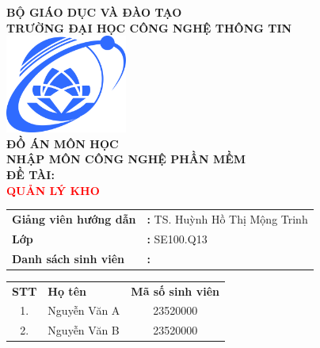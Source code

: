 \documentclass[../main.tex]{subfiles}
\begin{document}
\begin{titlepage}
    \centering
    
    \vspace*{1cm}
    {\large\textbf{BỘ GIÁO DỤC VÀ ĐÀO TẠO}}\\[0.3cm]
    {\large\textbf{TRƯỜNG ĐẠI HỌC CÔNG NGHỆ THÔNG TIN}}\\[1.0cm]
    \includegraphics[width=0.3\textwidth]{assets/UIT.png}\\[1.0cm]
    {\large\textbf{ĐỒ ÁN MÔN HỌC}}\\[0.3cm]
    {\Large\textbf{NHẬP MÔN CÔNG NGHỆ PHẦN MỀM}}\\[1cm]
    
    {\large\textbf{ĐỀ TÀI:}}\\[0.3cm]
    {\LARGE\textbf{\textcolor{red}{QUẢN LÝ KHO}}}\\[1.5cm]
    
    \begin{flushleft}
    \hspace{3cm}
    \begin{tabular}{ll}
        \textbf{Giảng viên hướng dẫn} & \textbf{:} \hspace{0.5cm} TS. Huỳnh Hồ Thị Mộng Trinh\\[0.3cm]
        \textbf{Lớp} & \textbf{:} \hspace{0.5cm} SE100.Q13\\[0.3cm]
        \textbf{Danh sách sinh viên} & \textbf{:}\\
    \end{tabular}
    \end{flushleft}
    
    \begin{center}
    \begin{tabular}{c l c}
        \textbf{STT} & \textbf{Họ tên} & \textbf{Mã số sinh viên}\\

        1. & Nguyễn Văn A & 23520000\\

        2. & Nguyễn Văn B & 23520000\\


\end{tabular}
\end{center}
\end{titlepage}
\end{document}
